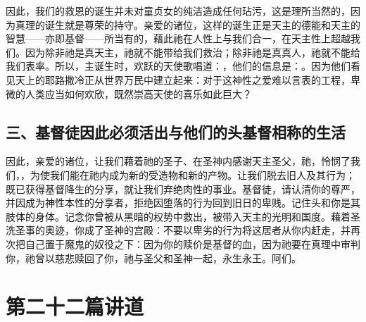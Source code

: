 因此，我们的救恩的诞生并未对童贞女的纯洁造成任何玷污，这是理所当然的，因为真理的诞生就是尊荣的持守。亲爱的诸位，这样的诞生正是天主的德能和天主的智慧——亦即基督——所当有的，藉此祂在人性上与我们合一，在天主性上超越我们。因为除非祂是真天主，祂就不能带给我们救治；除非祂是真真人，祂就不能给我们表率。所以，主诞生时，欢跃的天使歌唱道：，他们的信息是：。因为他们看见天上的耶路撒冷正从世界万民中建立起来：对于这神性之爱难以言表的工程，卑微的人类应当如何欢欣，既然崇高天使的喜乐如此巨大？\par


\subsection{三、基督徒因此必须活出与他们的头基督相称的生活}

因此，亲爱的诸位，让我们藉着祂的圣子、在圣神内感谢天主圣父，祂，怜悯了我们，，为使我们能在祂内成为新的受造物和新的产物。让我们脱去旧人及其行为；既已获得基督降生的分享，就让我们弃绝肉性的事业。基督徒，请认清你的尊严，并因成为神性本性的分享者，拒绝因堕落的行为回到旧日的卑贱。记住头和你是其肢体的身体。记念你曾被从黑暗的权势中救出，被带入天主的光明和国度。藉着圣洗圣事的奥迹，你成了圣神的宫殿：不要以卑劣的行为将这居者从你内赶走，并再次把自己置于魔鬼的奴役之下：因为你的赎价是基督的血，因为祂要在真理中审判你，祂曾以慈悲赎回了你，祂与圣父和圣神一起，永生永王。阿们。\par



\section{第二十二篇讲道}

\par


